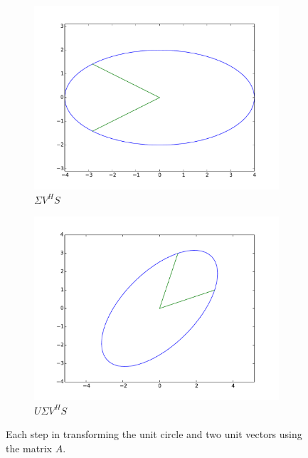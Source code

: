 \begin{figure}
\begin{subfigure}[b]{.49\textwidth}
  \includegraphics[width=\textwidth]{svcircle.pdf}
  \caption{$\Sigma V^H S$}
\end{subfigure}
\begin{subfigure}[b]{.49\textwidth}
  \centering
  \includegraphics[width=\textwidth]{full_transformation.pdf}
  \caption{$U \Sigma V^H S$}
\end{subfigure}
\caption{Each step in transforming the unit circle and two unit vectors using the matrix $A$.}
\label{fig:sol1}
\end{figure}


